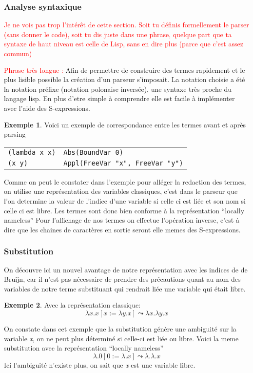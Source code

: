 \documentclass {article}
\theoremstyle{definition}
\newtheorem{example}{Exemple}
\theoremstyle{remark}
\newcommand{\todo}[1]{\textcolor{red}{#1}}
\begin{document}
\subsubsection{Analyse syntaxique}
\label{arsing}
\todo{Je ne vois pas trop l'intérêt de cette section. Soit tu définis
  formellement le parser (sans donner le code), soit tu dis juste dans
  une phrase, quelque part que ta syntaxe de haut niveau est celle de
  Lisp, sans en dire plus (parce que c'est assez commun)}

\todo{Phrase très longue :}
Afin de permettre de construire des termes rapidement et le plus lisible 
possible la création d'un parseur s'imposait.
La notation choisie a été la notation préfixe (notation polonaise inversée),
une syntaxe très proche du langage lisp. En plus d'etre simple à comprendre
elle est facile à implémenter avec l'aide des S-expressions.

\begin{example}
  Voici un exemple de correspondance entre les termes avant et après parsing
  \begin{tabular}{ll}
    \lstinline!(lambda x x)! & \lstinline!Abs(BoundVar 0)! \\
    \lstinline!(x y)! & \lstinline!Appl(FreeVar "x", FreeVar "y")!
  \end{tabular}
\end{example}

Comme on peut le constater dans l'exemple pour alléger la redaction des termes,
on utilise une représentation des variables classiques, c'est dans le parseur que 
l'on determine la valeur de l'indice d'une variable si celle ci est liée et son 
nom si celle ci est libre. Les termes sont donc bien conforme à la 
représentation ``locally nameless''
Pour l'affichage de nos termes on effectue l'opération inverse, c'est à dire que
les chaines de caractères en sortie seront elle memes des S-expressions.

\subsubsection{Substitution}

On découvre ici un nouvel avantage de notre représentation avec les indices de
de Bruijn, car il n'est pas nécessaire de prendre des précautions quant au
nom des variables de notre terme substituant qui rendrait liée une variable qui était libre. 

\begin{example}
  Avec la représentation classique:
  \[ 
  \lambda x.x[x := \lambda y.x]\leadsto\lambda x.\lambda y.x
  \]
  
  On constate dans cet exemple que la substitution génère une ambiguité sur la variable \emph{x},
  on ne peut plus déterminé si celle-ci est liée ou libre.
  Voici la meme substitution avec la représentation ``locally nameless''
  \[ 
  \lambda.0[0 := \lambda.x]\leadsto\lambda.\lambda.x
  \]
  Ici l'ambiguité n'existe plus, on sait que \emph{x} est une variable libre.
\end{example}
\end{document}
